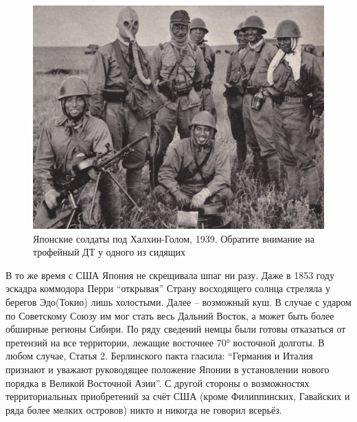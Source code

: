 \begin{figure}[h!tb] 
	\centering\includegraphics[scale=0.45]{Glava1/ElRqW9KibOM.jpg}
	\caption{Японские солдаты под Халхин-Голом, 1939. Обратите внимание на трофейный ДТ у одного из сидящих}%
\end{figure}

В то же время с США Япония не скрещивала шпаг ни разу. Даже в 1853 году эскадра коммодора Перри “открывая” Страну восходящего солнца стреляла у берегов Эдо(Токио) лишь холостыми. Далее – возможный куш. В случае с ударом по Советскому Союзу им мог стать весь Дальний Восток, а может быть более обширные регионы Сибири. По ряду сведений немцы были готовы отказаться от претензий на все территории, лежащие восточнее 70° восточной долготы. В любом случае, Статья 2. Берлинского пакта гласила: “Германия и Италия признают и уважают руководящее положение Японии в установлении нового порядка в Великой Восточной Азии”. С другой стороны о возможностях территориальных приобретений за счёт США (кроме Филиппинских, Гавайских и ряда более мелких островов) никто и никогда не говорил всерьёз.

